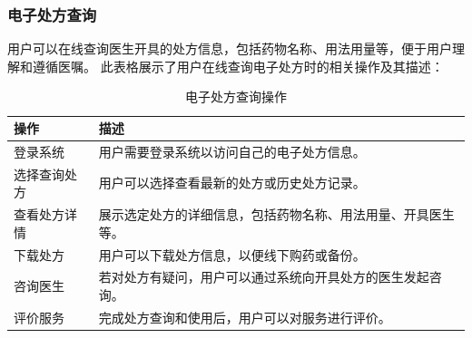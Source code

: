 \subsubsection{电子处方查询}
用户可以在线查询医生开具的处方信息，包括药物名称、用法用量等，便于用户理解和遵循医嘱。
此表格展示了用户在线查询电子处方时的相关操作及其描述：
\begin{table}[htbp]
	\centering
	\begin{tabular}{|p{6cm}|p{6cm}|}
		\hline
		\textbf{操作} & \textbf{描述} \\
		\hline
		登录系统 & 用户需要登录系统以访问自己的电子处方信息。 \\
		选择查询处方 & 用户可以选择查看最新的处方或历史处方记录。 \\
		查看处方详情 & 展示选定处方的详细信息，包括药物名称、用法用量、开具医生等。 \\
		下载处方 & 用户可以下载处方信息，以便线下购药或备份。 \\
		咨询医生 & 若对处方有疑问，用户可以通过系统向开具处方的医生发起咨询。 \\
		评价服务 & 完成处方查询和使用后，用户可以对服务进行评价。 \\
		\hline
	\end{tabular}
	\caption{电子处方查询操作}
\end{table}

